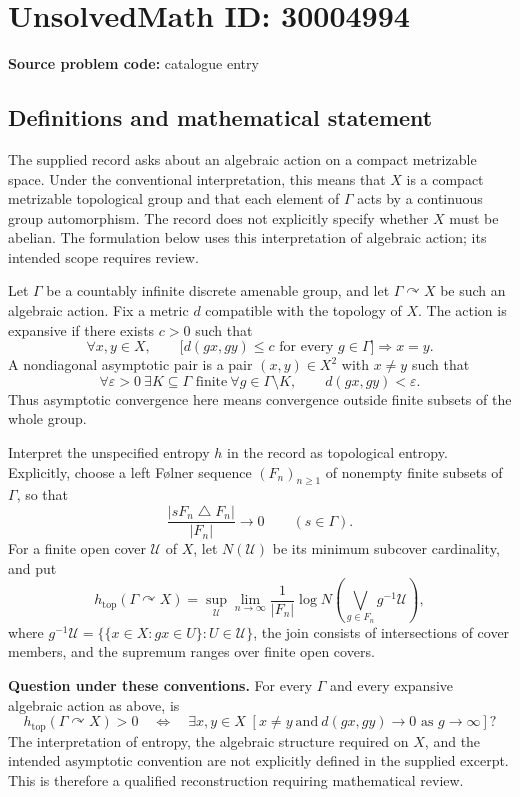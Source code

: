\documentclass[11pt]{article}
\begin{document}
\section*{UnsolvedMath ID: 30004994}
\textbf{Source problem code:} catalogue entry
\subsection{Definitions and mathematical statement}
The supplied record asks about an algebraic action on a compact metrizable space. Under the conventional interpretation, this means that \(X\) is a compact metrizable topological group and that each element of \(\Gamma\) acts by a continuous group automorphism. The record does not explicitly specify whether \(X\) must be abelian. The formulation below uses this interpretation of algebraic action; its intended scope requires review.

Let \(\Gamma\) be a countably infinite discrete amenable group, and let \(\Gamma\curvearrowright X\) be such an algebraic action. Fix a metric \(d\) compatible with the topology of \(X\). The action is expansive if there exists \(c>0\) such that
\[
\forall x,y\in X,\qquad \bigl[d(gx,gy)\leq c\text{ for every }g\in\Gamma\bigr]\Longrightarrow x=y.
\]
A nondiagonal asymptotic pair is a pair \((x,y)\in X^2\) with \(x\ne y\) such that
\[
\forall\varepsilon>0\ \exists K\subseteq\Gamma\text{ finite}\ \forall g\in\Gamma\setminus K,\qquad d(gx,gy)<\varepsilon.
\]
Thus asymptotic convergence here means convergence outside finite subsets of the whole group.

Interpret the unspecified entropy \(h\) in the record as topological entropy. Explicitly, choose a left F\o lner sequence \((F_n)_{n\geq1}\) of nonempty finite subsets of \(\Gamma\), so that
\[
\frac{|sF_n\mathbin{\triangle}F_n|}{|F_n|}\longrightarrow0\qquad(s\in\Gamma).
\]
For a finite open cover \(\mathcal U\) of \(X\), let \(N(\mathcal U)\) be its minimum subcover cardinality, and put
\[
h_{\mathrm{top}}(\Gamma\curvearrowright X)
=\sup_{\mathcal U}\lim_{n\to\infty}\frac{1}{|F_n|}
\log N\!\left(\bigvee_{g\in F_n}g^{-1}\mathcal U\right),
\]
where \(g^{-1}\mathcal U=\{\{x\in X:gx\in U\}:U\in\mathcal U\}\), the join consists of intersections of cover members, and the supremum ranges over finite open covers.

\textbf{Question under these conventions.} For every \(\Gamma\) and every expansive algebraic action as above, is
\[
h_{\mathrm{top}}(\Gamma\curvearrowright X)>0
\quad\Longleftrightarrow\quad
\exists x,y\in X\;\left[x\ne y\ \text{and}\ d(gx,gy)\longrightarrow0\text{ as }g\to\infty\right]?
\]
The interpretation of entropy, the algebraic structure required on \(X\), and the intended asymptotic convention are not explicitly defined in the supplied excerpt. This is therefore a qualified reconstruction requiring mathematical review.
\end{document}
